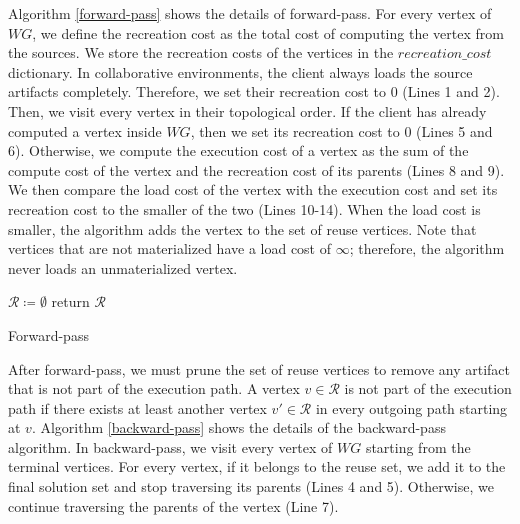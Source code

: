 Algorithm \ref{forward-pass} shows the details of forward-pass.
For every vertex of $WG$, we define the recreation cost as the total cost of computing the vertex from the sources.
We store the recreation costs of the vertices in the $recreation\_cost$ dictionary.
In collaborative environments, the client always loads the source artifacts completely.
Therefore, we set their recreation cost to 0 (Lines 1 and 2).
Then, we visit every vertex in their topological order.
If the client has already computed a vertex inside $WG$, then we set its recreation cost to 0 (Lines 5 and 6).
Otherwise, we compute the execution cost of a vertex as the sum of the compute cost of the vertex and the recreation cost of its parents (Lines 8 and 9).
We then compare the load cost of the vertex with the execution cost and set its recreation cost to the smaller of the two (Lines 10-14).
When the load cost is smaller, the algorithm adds the vertex to the set of reuse vertices.
Note that vertices that are not materialized have a load cost of $\infty$; therefore, the algorithm never loads an unmaterialized vertex.

\begin{algorithm}[h]
$\mathcal{R} \coloneqq \emptyset$\;
return $\mathcal{R}$\;
\caption{Forward-pass}\label{forward-pass}
\end{algorithm}
After forward-pass, we must prune the set of reuse vertices to remove any artifact that is not part of the execution path.
A vertex $v \in \mathcal{R}$ is not part of the execution path if there exists at least another vertex $v' \in \mathcal{R}$ in every outgoing path starting at $v$.
Algorithm \ref{backward-pass} shows the details of the backward-pass algorithm.
In backward-pass, we visit every vertex of $WG$ starting from the terminal vertices.
For every vertex, if it belongs to the reuse set, we add it to the final solution set and stop traversing its parents (Lines 4 and 5).
Otherwise, we continue traversing the parents of the vertex (Line 7).

